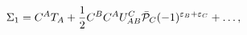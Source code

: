\begin{equation}\label{12}
\Sigma_1=C^AT_A+\frac{1}{2}C^BC^AU^C_{AB}\bar{\cal P}_C
(-1)^{\varepsilon_B+\varepsilon_C}+\ldots,
\end{equation}

